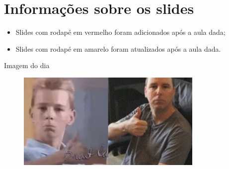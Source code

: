 \documentclass{beamer}
\begin{document}
\section{Informações sobre os slides}

\begin{frame}
      
      \begin{itemize}
            \item Slides com rodapé em vermelho foram adicionados após a aula dada;
            \item Slides com rodapé em amarelo foram atualizados  após a aula dada.
      \end{itemize}
\end{frame}

\begin{frame}[fragile]{Imagem do dia}

        \begin{figure}[H]
            \centerline{\includegraphics[width=0.8\textwidth]{assets/imagem-do-dia/brent_rambo.jpg}}
            
        \end{figure}
\end{frame}


\footlinecolor{}

\backmatter
\end{document}
